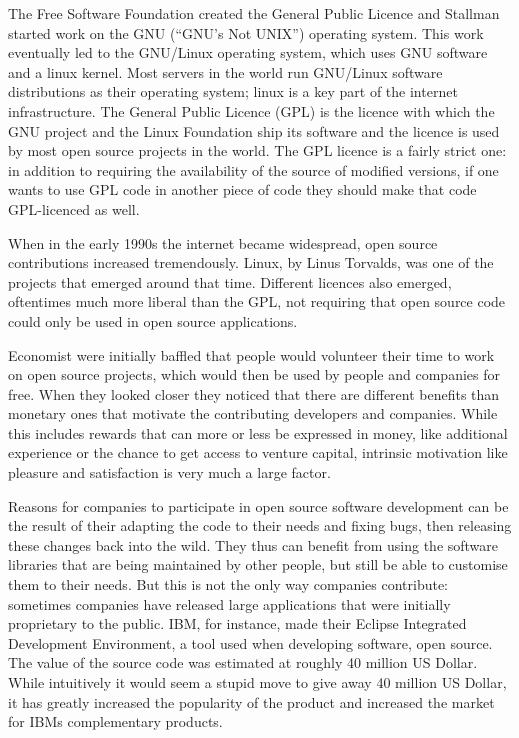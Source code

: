 \documentclass{article}
\begin{document}
The Free Software Foundation created the General Public Licence and Stallman
started work on the GNU (``GNU's Not UNIX'') operating system. This work
eventually led to the GNU/Linux operating system, which uses GNU software and
a linux kernel.\cite{fsfstallman} Most servers in the world run GNU/Linux
software distributions as their operating system; linux is a key part of the
internet infrastructure. The General Public Licence (GPL) is the licence with
which the GNU project and the Linux Foundation ship its software and the
licence is used by most open source projects in the world.\cite{lerner04} The
GPL licence is a fairly strict one: in addition to requiring the availability
of the source of modified versions, if one wants to use GPL code in another
piece of code they should make that code GPL-licenced as well.\cite{gpl}

When in the early 1990s the internet became widespread, open source
contributions increased tremendously. Linux, by Linus Torvalds, was one of the
projects that emerged around that time. Different licences also emerged,
oftentimes much more liberal than the GPL, not requiring that open source code
could only be used in open source applications.

Economist were initially baffled that people would volunteer their time to work
on open source projects, which would then be used by people and companies for
free. When they looked closer they noticed that there are different benefits
than monetary ones that motivate the contributing developers and companies.
While this includes rewards that can more or less be expressed in money, like
additional experience or the chance to get access to venture capital, intrinsic
motivation like pleasure and satisfaction is very much a large
factor.\cite{lerner04}

Reasons for companies to participate in open source software development can be
the result of their adapting the code to their needs and fixing bugs, then
releasing these changes back into the wild. They thus can benefit from using
the software libraries that are being maintained by other people, but still be
able to customise them to their needs.\cite{lerner04} But this is not the only
way companies contribute: sometimes companies have released large applications
that were initially proprietary to the public. IBM, for instance, made their
Eclipse Integrated Development Environment, a tool used when developing
software, open source. The value of the source code was estimated at roughly 40
million US Dollar. While intuitively it would seem a stupid move to give away
40 million US Dollar, it has greatly increased the popularity of the product
and increased the market for IBMs complementary products.\cite{fitzgerald06} 
\end{document}
